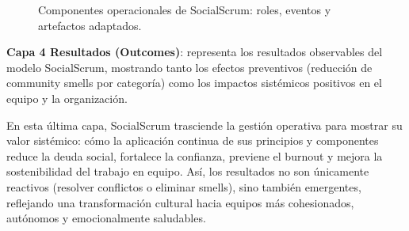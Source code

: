 \begin{figure}[!htbp]
    \caption{\normalsize Componentes operacionales de SocialScrum: roles, eventos y artefactos adaptados.}
    \label{fig:componentes_operacionales}
\end{figure}

\FloatBarrier

\textbf{Capa 4 Resultados (Outcomes)}: representa los resultados observables del modelo SocialScrum, mostrando tanto los efectos preventivos (reducción de community smells por categoría) como los impactos sistémicos positivos en el equipo y la organización.

En esta última capa, SocialScrum trasciende la gestión operativa para mostrar su valor sistémico: cómo la aplicación continua de sus principios y componentes reduce la deuda social, fortalece la confianza, previene el burnout y mejora la sostenibilidad del trabajo en equipo.
Así, los resultados no son únicamente reactivos (resolver conflictos o eliminar smells), sino también emergentes, reflejando una transformación cultural hacia equipos más cohesionados, autónomos y emocionalmente saludables.

